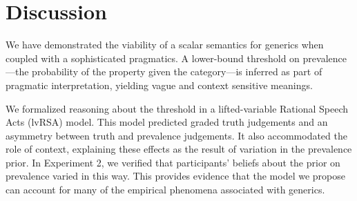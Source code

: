 \documentclass[10pt,letterpaper]{article}
\begin{document}
\section{Discussion}



We have demonstrated the viability of a scalar semantics for generics when coupled with a sophisticated pragmatics. 
A lower-bound threshold on prevalence---the probability of the property given the category---is inferred as part of pragmatic interpretation, yielding vague and context sensitive meanings. 
%

%
We formalized reasoning about the threshold in a lifted-variable Rational Speech Acts (lvRSA) model. This model predicted graded truth judgements and an asymmetry between truth and prevalence judgements. It also accommodated the role of context, explaining these effects as the result of variation in the prevalence prior. 
In Experiment 2, we verified that participants' beliefs about the prior on prevalence varied in this way. 
This provides evidence that the model we propose can account for many of the empirical phenomena associated with generics.

%
\end{document}
